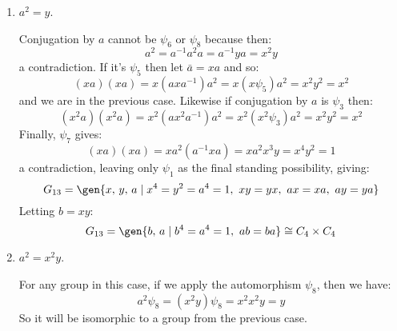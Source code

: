 \begin{enumerate}
\begin{enumerate}[\bfseries A:]
            \item \(a^2 = y\).

                Conjugation by \(a\) cannot be \(\psi_6\) or \(\psi_8\) because then:
                \[a^2 = a^{-1}a^2 a = a^{-1}ya = x^2 y\]
                a contradiction.
                If it's \(\psi_5\) then let \(\bar{a} = xa\) and so:
                \[(xa)(xa) = x(axa^{-1})a^2 = x(x\psi_5)a^2 = x^2 y^2 = x^2\]
                and we are in the previous case.
                Likewise if conjugation by \(a\) is \(\psi_3\) then:
                \[(x^2 a)(x^2 a) = x^2(ax^2 a^{-1})a^2 = x^2(x^2\psi_3)a^2 = x^2 y^2 = x^2\]
                Finally, \(\psi_7\) gives:
                \[(xa)(xa) = xa^2(a^{-1}xa) = xa^2 x^3 y = x^4 y^2 = 1\]
                a contradiction, leaving only \(\psi_1\) as the final standing possibility, giving:
                \[G_{13} = \gen{x,\,y,\,a \mid x^4 = y^2 = a^4 = 1,\ xy = yx,\ ax = xa,\ ay = ya}\]
                Letting \(b = xy\):
                \[G_{13} = \gen{b,\,a \mid b^4 = a^4 = 1,\ ab = ba} \cong C_4 \times C_4\]

            \item \(a^2 = x^2 y\).

                For any group in this case, if we apply the automorphism \(\psi_8\), then we have:
                \[a^2\psi_8 = (x^2 y)\psi_8 = x^2 x^2 y = y\]
                So it will be isomorphic to a group from the previous case.

        \end{enumerate}

\end{enumerate}
